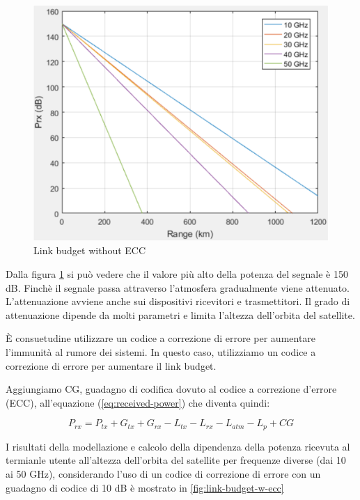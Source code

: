 \begin{figure}[htbp]
  \centering
  \includegraphics[width=0.8\linewidth]{./res/img/link_budget_wo_ecc.png}
  \caption{Link budget without \ac{ECC}}
  \label{fig:link-budget-wo-ecc}
\end{figure}

Dalla figura \ref{fig:link-budget-wo-ecc} si può vedere che il valore più alto della potenza del segnale è 150 dB.
Finchè il segnale passa attraverso l'atmosfera gradualmente viene attenuato.
L'attenuazione avviene anche sui dispositivi ricevitori e trasmettitori.
Il grado di attenuazione dipende da molti parametri e limita l'altezza dell'orbita del satellite.

È consuetudine utilizzare un codice a correzione di errore per aumentare l'immunità al rumore dei sistemi.
In questo caso, utilizziamo un codice a correzione di errore per aumentare il link budget.

Aggiungiamo CG, guadagno di codifica dovuto al codice a correzione d'errore (\ac{ECC}), all'equazione (\ref{eq:received-power}) che diventa quindi:

\begin{equation}
  P_{rx} = P_{tx} + G_{tx} + G_{rx} - L_{tx} - L_{rx} - L_{atm} - L_{p} + CG
\end{equation}

I risultati della modellazione e calcolo della dipendenza della potenza ricevuta al termianle utente all'altezza dell'orbita del satellite per frequenze diverse (dai 10 ai 50 GHz), considerando l'uso di un codice di correzione di errore con un guadagno di codice di 10 dB è mostrato in \ref{fig:link-budget-w-ecc}

